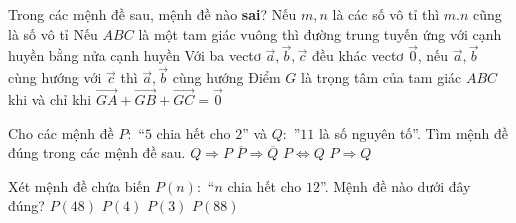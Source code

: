 \begin{ex}%
Trong các mệnh đề sau, mệnh đề nào \textbf{sai}?
\choice
{\True Nếu $m,n$ là các số vô tỉ thì $m.n$ cũng là số vô tỉ}
{Nếu $ABC$ là một tam giác vuông thì đường trung tuyến ứng với cạnh huyền bằng nửa cạnh huyền}
{Với ba vectơ $\overrightarrow{a},\overrightarrow{b},\overrightarrow{c}$ đều khác vectơ $\overrightarrow{0}$, nếu $\overrightarrow{a},\overrightarrow{b}$ cùng hướng với $\overrightarrow{c}$ thì $\overrightarrow{a},\overrightarrow{b}$ cùng hướng}
{Điểm $G$ là trọng tâm của tam giác $ABC$ khi và chỉ khi $\overrightarrow{GA}+\overrightarrow{GB}+\overrightarrow{GC}=\overrightarrow{0}$}
\end{ex}

\begin{ex}
Cho các mệnh đề $ P:$ “$5$ chia hết cho $2$” và $Q:$ ”$11$ là số nguyên tố”. Tìm mệnh đề đúng trong các mệnh đề sau.
\choice
{$Q \Rightarrow P$}
{$\overline{P} \Rightarrow \overline{Q}$}
{$P \Leftrightarrow Q$}
{\True $P \Rightarrow Q$}
\end{ex}

\begin{ex}%
Xét mệnh đề chứa biến $P(n):$ “$n$ chia hết cho $12$”. Mệnh đề nào dưới đây đúng?
\choice 
{\True $P(48)$} 
{ $P(4) $} 
{ $P(3)$} 
{ $P(88)$}
\end{ex}

